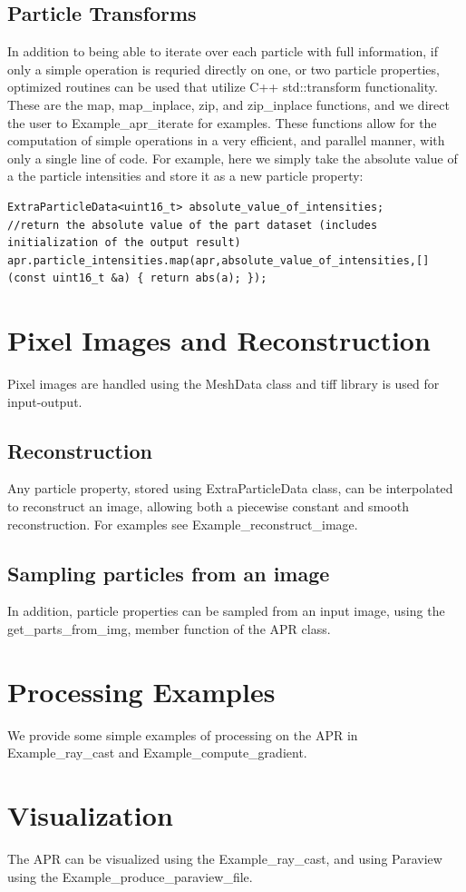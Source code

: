 \documentclass[12pt]{article}
\begin{document}
\subsection{Particle Transforms}
In addition to being able to iterate over each particle with full information, if only a simple operation is requried directly on one, or two particle properties, optimized routines can be used that utilize C++ std::transform functionality. These are the map, map\_inplace, zip, and zip\_inplace functions, and we direct the user to Example\_apr\_iterate for examples. These functions allow for the computation of simple operations in a very efficient, and parallel manner, with only a single line of code. For example, here we simply take the absolute value of a the particle intensities and store it as a new particle property:
\begin{lstlisting}
ExtraParticleData<uint16_t> absolute_value_of_intensities;
//return the absolute value of the part dataset (includes initialization of the output result)
apr.particle_intensities.map(apr,absolute_value_of_intensities,[](const uint16_t &a) { return abs(a); });
\end{lstlisting}
\section{Pixel Images and Reconstruction}
Pixel images are handled using the MeshData class and tiff library is used for input-output.
\subsection{Reconstruction}
Any particle property, stored using ExtraParticleData class, can be interpolated to reconstruct an image, allowing both a piecewise constant and smooth reconstruction. For examples see Example\_reconstruct\_image.
\subsection{Sampling particles from an image}
In addition, particle properties can be sampled from an input image, using the get\_parts\_from\_img, member function of the APR class.
\section{Processing Examples}
We provide some simple examples of processing on the APR in Example\_ray\_cast and Example\_compute\_gradient.
\section{Visualization}
The APR can be visualized using the Example\_ray\_cast, and using Paraview using the Example\_produce\_paraview\_file.
\end{document}
